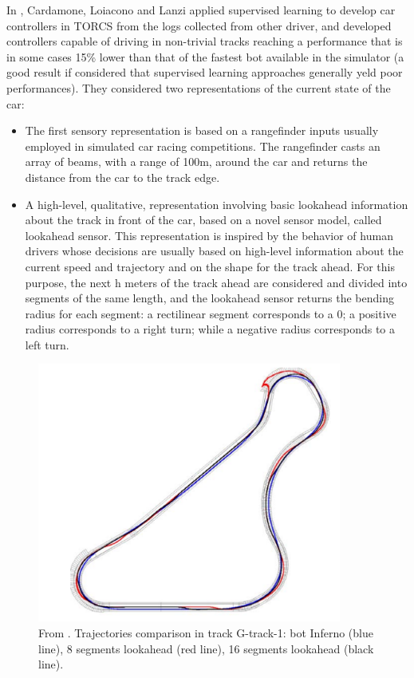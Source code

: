 In  \cite{cardamone}, Cardamone, Loiacono and Lanzi applied supervised learning to develop car controllers in TORCS from the logs collected from other driver, and developed controllers capable of driving in non-trivial tracks reaching a performance that is in some cases 15\% lower than that of the fastest bot available in
the simulator (a good result if considered that supervised learning approaches generally yeld poor performances).
They considered two representations of the current state of the car:
\begin{itemize}
\item The first sensory representation is based on a rangefinder inputs usually employed in simulated car racing competitions.
The rangefinder casts an array of beams, with a range of 100m, around the car and returns the distance from the car to the track edge.
\item  A high-level, qualitative, representation involving basic lookahead information about the track in front of the car, based on a  novel sensor model, called lookahead sensor. This representation is inspired by the behavior of human drivers whose decisions are usually based on high-level information about the current speed and trajectory and on the shape for the track ahead. 
For this purpose, the next h meters of the track ahead are considered and divided into segments of the same length, and the lookahead sensor returns the bending radius for each segment: a rectilinear segment corresponds to a 0; a positive radius corresponds to a right turn; while a negative radius corresponds to a left turn. 
\end{itemize} 
\begin{figure}
 \centering
  \captionsetup{width=10cm}
  \includegraphics[width=10cm]{./img/cardamone}
  \caption{From \cite{cardamone}. Trajectories comparison in track G-track-1: bot Inferno (blue line), 8 segments lookahead (red line), 16 segments lookahead (black line).}
\end{figure}
